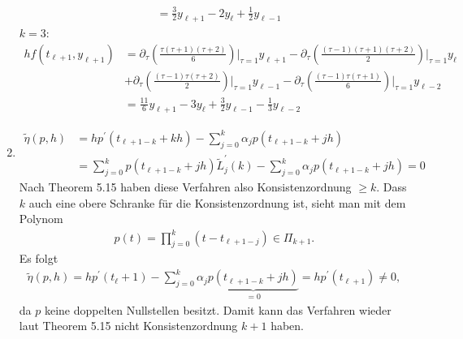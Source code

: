 \begin{solution}
\begin{enumerate}[label = \textbf{\alph*)}]
\begin{align*}
  &= \frac{3}{2}y_{\ell + 1} - 2y_{\ell} + \frac{1}{2}y_{\ell - 1}
  \end{align*}
  $k = 3$:
  \begin{align*}
  hf(t_{\ell + 1},y_{\ell + 1}) &= \partial_{\tau}\left(\frac{\tau(\tau + 1)(\tau + 2)}{6}\right)
  \Bigg|_{\tau = 1}y_{\ell + 1} -
  \partial_{\tau}\left(\frac{(\tau - 1)(\tau + 1)(\tau + 2)}{2}\right)
  \Bigg|_{\tau = 1}y_{\ell} \\
  &+ \partial_{\tau}\left(\frac{(\tau - 1)\tau(\tau + 2)}{2}\right)
  \Bigg|_{\tau = 1}y_{\ell - 1} -
  \partial_{\tau}\left(\frac{(\tau - 1)\tau(\tau + 1)}{6}\right)
  \Bigg|_{\tau = 1}y_{\ell - 2}
  \\
  &= \frac{11}{6}y_{\ell + 1} - 3y_{\ell} + \frac{3}{2}y_{\ell - 1} - \frac{1}{3}y_{\ell - 2}
  \end{align*}
  \item
  \begin{align*}
    \tilde{\eta}(p,h) &= hp^{\prime}(t_{\ell + 1 - k} + kh)
    - \sum_{j = 0}^k \alpha_jp(t_{\ell + 1 - k} + jh) \\
    &= \sum_{j= 0}^k p(t_{\ell + 1 - k} + jh)\tilde{L}_j^{\prime}(k)
    - \sum_{j = 0}^k \alpha_jp(t_{\ell + 1 - k} + jh) = 0
  \end{align*}
  Nach Theorem 5.15 haben diese Verfahren also Konsistenzordnung $\geq k$.
  Dass $k$ auch eine obere Schranke für die Konsistenzordnung ist, sieht man mit
  dem Polynom
  \begin{align*}
    p(t) = \prod_{j = 0}^k (t- t_{\ell + 1 - j}) \in \Pi_{k+1}.
  \end{align*}
  Es folgt
  \begin{align*}
    \tilde{\eta}(p,h) = hp^{\prime}(t_\ell + 1) - \sum_{j = 0}^k \alpha_j \underbrace{p(t_{\ell + 1 -k} + jh)}_{=0}
    = hp^{\prime}(t_{\ell + 1}) \neq 0,
  \end{align*}
  da $p$ keine doppelten Nullstellen besitzt.
  Damit kann das Verfahren wieder laut Theorem 5.15 nicht Konsistenzordnung $k + 1$ haben.
\end{enumerate}
\end{solution}
